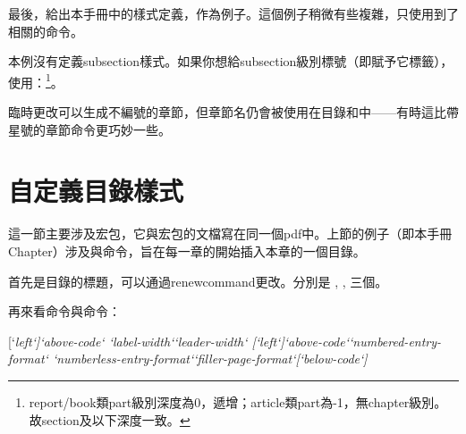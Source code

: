 最後，給出本手冊中的樣式定義，作為例子。這個例子稍微有些複雜，只使用到了相關的命令。

本例沒有定義subsection樣式。如果你想給subsection級別標號（即賦予它標籤），使用：\footnote{report/book類part級別深度為0，遞增；article類part為-1，無chapter級別。故section及以下深度一致。}。

臨時更改可以生成不編號的章節，但章節名仍會被使用在目錄和中——有時這比帶星號的章節命令更巧妙一些。

\section{自定義目錄樣式}
\label{sec:titletoc}
這一節主要涉及宏包，它與宏包的文檔寫在同一個pdf中。上節的例子（即本手冊Chapter）涉及與命令，旨在每一章的開始插入本章的一個目錄。

首先是目錄的標題，可以通過renewcommand更改。分別是 , , 三個。

再來看命令與命令：
\begin{latex}
[`\itshape left`]{`\itshape above-code`}
    {`\itshape label-width`}{`\itshape leader-width`}
[`\itshape left`]{`\itshape above-code`}{`\itshape numbered-entry-format`}
    {`\itshape numberless-entry-format`}{`\itshape filler-page-format`}[`\itshape below-code`]
\end{latex}


